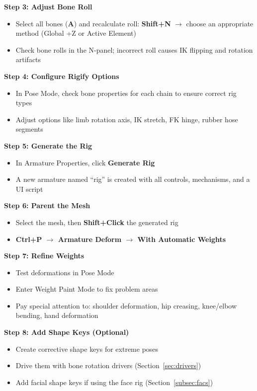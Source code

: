 \textbf{Step 3: Adjust Bone Roll}
\begin{itemize}[leftmargin=2em]
  \item Select all bones (\textbf{A}) and recalculate roll: \textbf{Shift+N} $\rightarrow$ choose an appropriate method (Global +Z or Active Element)
  \item Check bone rolls in the N-panel; incorrect roll causes IK flipping and rotation artifacts
\end{itemize}

\textbf{Step 4: Configure Rigify Options}
\begin{itemize}[leftmargin=2em]
  \item In Pose Mode, check bone properties for each chain to ensure correct rig types
  \item Adjust options like limb rotation axis, IK stretch, FK hinge, rubber hose segments
\end{itemize}

\textbf{Step 5: Generate the Rig}
\begin{itemize}[leftmargin=2em]
  \item In Armature Properties, click \textbf{Generate Rig}
  \item A new armature named ``rig'' is created with all controls, mechanisms, and a UI script
\end{itemize}

\textbf{Step 6: Parent the Mesh}
\begin{itemize}[leftmargin=2em]
  \item Select the mesh, then \textbf{Shift+Click} the generated rig
  \item \textbf{Ctrl+P $\rightarrow$ Armature Deform $\rightarrow$ With Automatic Weights}
\end{itemize}

\textbf{Step 7: Refine Weights}
\begin{itemize}[leftmargin=2em]
  \item Test deformations in Pose Mode
  \item Enter Weight Paint Mode to fix problem areas
  \item Pay special attention to: shoulder deformation, hip creasing, knee/elbow bending, hand deformation
\end{itemize}

\textbf{Step 8: Add Shape Keys (Optional)}
\begin{itemize}[leftmargin=2em]
  \item Create corrective shape keys for extreme poses
  \item Drive them with bone rotation drivers (Section~\ref{sec:drivers})
  \item Add facial shape keys if using the face rig (Section~\ref{subsec:facs})
\end{itemize}


